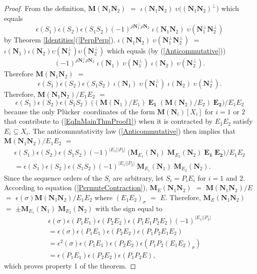 \documentclass[12pt]{article}
\theoremstyle{definition}
\newcommand{\Is}{\ensuremath{\iota}}
\newcommand{\Vs}{\ensuremath{\upsilon}}
\newcommand{\Card}[1]{\ensuremath{{\left|#1\right|}}}
\newcommand{\ext}[1]{\ensuremath{\mathbf{#1}}}
\newcommand{\Plucker}{Pl\"{u}cker\ }
\begin{document}
\begin{proof}
From the definition, $\ext{M}(\ext{N}_1\ext{N}_2)$ $=$
$\Is(\ext{N}_1\ext{N}_2)\;\Vs\big((\ext{N}_1\ext{N}_2)^\perp\big)$
which equals
\[
\epsilon(S_1)\epsilon(S_2)\epsilon(S_1S_2)
(-1)^{\rho\ext{N}_1^\perp\rho\ext{N}_2}\;
\Is(\ext{N}_1\ext{N}_2)\;\Vs(\ext{N}_1^\perp\ext{N}_2^\perp)
\]
by Theorem \ref{Identities}(\ref{PerpPerp}).
$\Is(\ext{N}_1\ext{N}_2)\;\Vs(\ext{N}_1^\perp\ext{N}_2^\perp)$ $=$
$\Is(\ext{N}_1)\Is(\ext{N}_2)\Vs(\ext{N}_1^\perp)\Vs(\ext{N}_2^\perp)$
which equals (by (\ref{Anticommutative}))
\[
(-1)^{\rho\ext{N}_1^\perp\rho\ext{N}_2}
\;\Is(\ext{N}_1)\;\Vs(\ext{N}_1^\perp)\;\Is(\ext{N}_2)\;\Vs(\ext{N}_2^\perp).
\]
Therefore $\ext{M}(\ext{N}_1\ext{N}_2)$ $=$
\begin{equation}
\label{PairsEqInMainThmProof1}
\epsilon(S_1)\epsilon(S_2)\epsilon(S_1S_2)
\;\Is(\ext{N}_1)\;\Vs(\ext{N}_1^\perp)\;\Is(\ext{N}_2)\;\Vs(\ext{N}_2^\perp).
\end{equation}
Therefore, 
$\ext{M}(\ext{N}_1\ext{N}_2)/E_1E_2$ $=$
\[
\epsilon(S_1)\epsilon(S_2)\epsilon(S_1S_2)\;
\big((\ext{M}(\ext{N}_1)/E_1)\;\ext{E_1}\;
(\ext{M}(\ext{N}_2)/E_2)\;\ext{E_2}\big)/E_1E_2
\]
because the only \Plucker coordinates of the form
$\ext{M}(\ext{N}_i)[X_i]$ for $i=1$ or $2$ that 
contribute to (\ref{EqInMainThmProof1}) when it is contracted
by $E_1E_2$ satisfy $E_i\subseteq X_i$.  
The anticommutativity law 
(\ref{Anticommutative}) then
implies that $\ext{M}(\ext{N}_1\ext{N}_2)/E_1E_2$ $=$
\begin{equation*}
\begin{split}
\epsilon(S_1)\epsilon(S_2)\epsilon(S_1S_2)(-1)^{\Card{E_1}\Card{P_2}}
\;\big(\ext{M}_{E_1}(\ext{N}_1)\;
 \ext{M}_{E_2}(\ext{N}_2)\;\ext{E_1}\;\ext{E_2}\big)/E_1E_2\\
=\epsilon(S_1)\epsilon(S_2)\epsilon(S_1S_2)(-1)^{\Card{E_1}\Card{P_2}}
\;\ext{M}_{E_1}(\ext{N}_1)\;\ext{M}_{E_2}(\ext{N}_2).
\end{split}
\end{equation*}
Since the sequence orders of the $S_i$ are arbitrary, let $S_i=P_iE_i$ for $i=1$ 
and $2$.
According to equation (\ref{PermuteContraction}),
$\ext{M}_E(\ext{N}_1\ext{N}_2)$ $=$ $\ext{M}(\ext{N}_1\ext{N}_2)/E$ $=$
$\epsilon(\sigma)\ext{M}(\ext{N}_1\ext{N}_2)/E_1E_2$ where $(E_1E_2)_\sigma$
$=$ $E$.  Therefore, $\ext{M}_E(\ext{N}_1\ext{N}_2)$ $=$
$\pm\ext{M}_{E_1}(\ext{N}_1)\;\ext{M}_{E_2}(\ext{N}_2)$ 
with the sign equal to
\begin{equation*}
\begin{split}
\epsilon(\sigma)
\epsilon(P_1E_1)\epsilon(P_2E_2)\epsilon(P_1E_1P_2E_2)
(-1)^{\Card{E_1}\Card{P_2}}\\
=
\epsilon(\sigma)
\epsilon(P_1E_1)\epsilon(P_2E_2)\epsilon(P_1P_2E_1E_2)\\
=
\epsilon^2(\sigma)
\epsilon(P_1E_1)\epsilon(P_2E_2)\epsilon(P_1P_2(E_1E_2)_\sigma)\\
=
\epsilon(P_1E_1)\epsilon(P_2E_2)\epsilon(P_1P_2E),
\end{split}
\end{equation*}
which proves property 1 of the theorem.


\end{proof}
\end{document}
